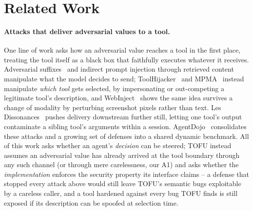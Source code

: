 \section{Related Work}

\paragraph{Attacks that deliver adversarial values to a tool.}
One line of work asks how an adversarial value reaches a tool in the first place, treating the tool itself as a black box that faithfully executes whatever it receives. Adversarial suffixes~\cite{zou2023universal} and indirect prompt injection through retrieved content~\cite{greshake2023not} manipulate what the model decides to send; ToolHijacker~\cite{toolhijacker} and MPMA~\cite{wang2026mpma} instead manipulate \emph{which tool} gets selected, by impersonating or out-competing a legitimate tool's description, and WebInject~\cite{wang2025webinject} shows the same idea survives a change of modality by perturbing screenshot pixels rather than text. Les Dissonances~\cite{les-dissonances} pushes delivery downstream further still, letting one tool's output contaminate a sibling tool's arguments within a session. AgentDojo~\cite{debenedetti2024agentdojo} consolidates these attacks and a growing set of defenses into a shared dynamic benchmark. All of this work asks whether an agent's \emph{decision} can be steered; TOFU instead assumes an adversarial value has already arrived at the tool boundary through any such channel (or through mere carelessness, our A1) and asks whether the \emph{implementation} enforces the security property its interface claims -- a defense that stopped every attack above would still leave TOFU's semantic bugs exploitable by a careless caller, and a tool hardened against every bug TOFU finds is still exposed if its description can be spoofed at selection time.

